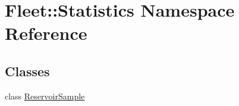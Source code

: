 \hypertarget{namespace_fleet_1_1_statistics}{}\section{Fleet\+:\+:Statistics Namespace Reference}
\label{namespace_fleet_1_1_statistics}
\subsection*{Classes}
\begin{DoxyCompactItemize}
\item 
class \hyperlink{class_fleet_1_1_statistics_1_1_reservoir_sample}{Reservoir\+Sample}
\end{DoxyCompactItemize}
